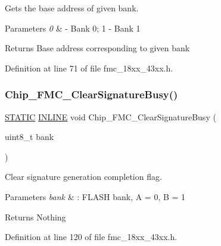 Gets the base address of given bank. 


\begin{DoxyParams}{Parameters}
{\em 0} & -\/ Bank 0; 1 -\/ Bank 1 \\
\hline
\end{DoxyParams}
\begin{DoxyReturn}{Returns}
Base address corresponding to given bank 
\end{DoxyReturn}


Definition at line 71 of file fmc\+\_\+18xx\+\_\+43xx.\+h.

\mbox{\label{group___f_m_c__18_x_x__43_x_x_ga270a1f9bf6a1c70415a84ebd7c0065fe}} 
\subsubsection{\texorpdfstring{Chip\+\_\+\+F\+M\+C\+\_\+\+Clear\+Signature\+Busy()}{Chip\_FMC\_ClearSignatureBusy()}}
{\footnotesize\ttfamily \hyperlink{group___l_p_c___types___public___macros_ga10b2d890d871e1489bb02b7e70d9bdfb}{S\+T\+A\+T\+IC} \hyperlink{spifi__18xx__43xx_8h_a2eb6f9e0395b47b8d5e3eeae4fe0c116}{I\+N\+L\+I\+NE} void Chip\+\_\+\+F\+M\+C\+\_\+\+Clear\+Signature\+Busy (\begin{DoxyParamCaption}\item[{uint8\+\_\+t}]{bank }\end{DoxyParamCaption})}



Clear signature generation completion flag. 


\begin{DoxyParams}{Parameters}
{\em bank} & \+: F\+L\+A\+SH bank, A = 0, B = 1 \\
\hline
\end{DoxyParams}
\begin{DoxyReturn}{Returns}
Nothing 
\end{DoxyReturn}


Definition at line 120 of file fmc\+\_\+18xx\+\_\+43xx.\+h.

